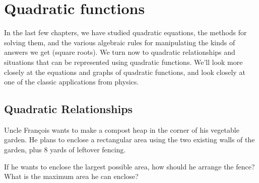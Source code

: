 \chapter{Quadratic functions}
\label{ch:quadfunc}


In the last few chapters, we have studied quadratic equations, the methods for solving them, and the various algebraic rules for manipulating the kinds of answers we get (square roots). We turn now to quadratic relationships and situations that can be represented using quadratic functions. We'll look more closely at the equations and graphs of quadratic functions, and look closely at one of the classic applications from physics.

\section{Quadratic Relationships}
\label{sec:quadrelationships}


\begin{boxexplore}
Uncle Fran\c{c}ois wants to make a compost heap in the corner of his vegetable garden. He plans to enclose a rectangular area using the two existing walls of the garden, plus 8 yards of leftover fencing.


\begin{center}
\end{center}

If he wants to enclose the largest possible area, how should he arrange the fence? What is the maximum area he can enclose?
\end{boxexplore}

